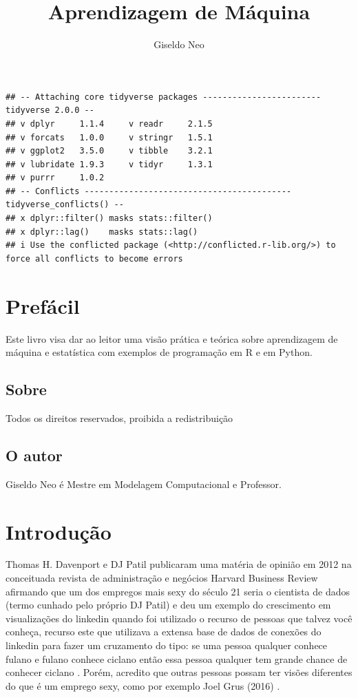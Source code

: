 \documentclass[
]{book}
\title{Aprendizagem de Máquina}
\author{Giseldo Neo}
\date{}
\begin{document}
\maketitle

{
\setcounter{tocdepth}{1}
\tableofcontents
}
\begin{verbatim}
## -- Attaching core tidyverse packages ------------------------ tidyverse 2.0.0 --
## v dplyr     1.1.4     v readr     2.1.5
## v forcats   1.0.0     v stringr   1.5.1
## v ggplot2   3.5.0     v tibble    3.2.1
## v lubridate 1.9.3     v tidyr     1.3.1
## v purrr     1.0.2     
## -- Conflicts ------------------------------------------ tidyverse_conflicts() --
## x dplyr::filter() masks stats::filter()
## x dplyr::lag()    masks stats::lag()
## i Use the conflicted package (<http://conflicted.r-lib.org/>) to force all conflicts to become errors
\end{verbatim}

\chapter*{Prefácil}\label{prefuxe1cil}

Este livro visa dar ao leitor uma visão prática e teórica sobre aprendizagem de máquina e estatística com exemplos de programação em R e em Python.

\section*{Sobre}\label{sobre}

Todos os direitos reservados, proibida a redistribuição

\section*{O autor}\label{o-autor}

Giseldo Neo é Mestre em Modelagem Computacional e Professor.

\chapter{Introdução}\label{introduuxe7uxe3o}

Thomas H. Davenport e DJ Patil publicaram uma matéria de opinião em 2012 na conceituada revista de administração e negócios Harvard Business Review afirmando que um dos empregos mais sexy do século 21 seria o cientista de dados (termo cunhado pelo próprio DJ Patil) e deu um exemplo do crescimento em visualizações do linkedin quando foi utilizado o recurso de pessoas que talvez você conheça, recurso este que utilizava a extensa base de dados de conexões do linkedin para fazer um cruzamento do tipo: se uma pessoa qualquer conhece fulano e fulano conhece ciclano então essa pessoa qualquer tem grande chance de conhecer ciclano \citep{hbr2012}. Porém, acredito que outras pessoas possam ter visões diferentes do que é um emprego sexy, como por exemplo Joel Grus (2016) \citep{grus2016}.
\end{document}
